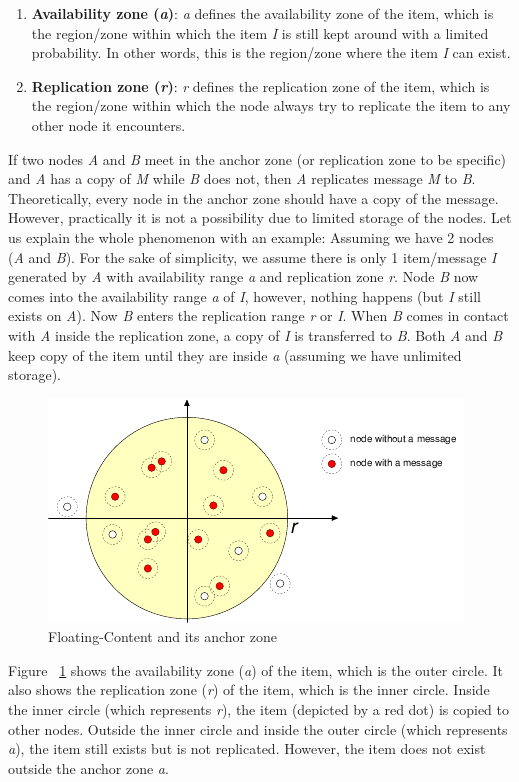 \begin{enumerate}
  \item \textbf{Availability zone (\textit{a})}: \textit{a} defines the availability zone of the item, which is the region/zone within which the item \textit{I} is still kept around with a limited probability. In other words, this is the region/zone where the item \textit{I} can exist.
  \item \textbf{Replication zone (\textit{r})}: \textit{r} defines the replication zone of the item, which is the region/zone within which the node always try to replicate the item to any other node it encounters.
\end{enumerate}
\vspace{3mm}
If two nodes \textit{A} and \textit{B} meet in the anchor zone (or replication zone to be specific) and \textit{A} has a copy of \textit{M} while \textit{B} does not, then \textit{A} replicates message \textit{M} to \textit{B}. Theoretically, every node in the anchor zone should have a copy of the message. However, practically it is not a possibility due to limited storage of the nodes.
\vspace{3mm}
Let us explain the whole phenomenon with an example:
Assuming we have 2 nodes (\textit{A} and \textit{B}). For the sake of simplicity, we assume there is only 1 item/message \textit{I} generated by \textit{A} with availability range \textit{a} and replication zone \textit{r}. Node \textit{B} now comes into the availability range \textit{a} of \textit{I}, however, nothing happens (but \textit{I} still exists on \textit{A}). Now \textit{B} enters the replication range \textit{r} or \textit{I}. When \textit{B} comes in contact with \textit{A} inside the replication zone, a copy of \textit{I} is transferred to \textit{B}. Both \textit{A} and \textit{B} keep copy of the item until they are inside \textit{a} (assuming we have unlimited storage).

\begin{figure}[h]
\centering
\includegraphics{./figures/anchor-zone}
\caption{Floating-Content and its anchor zone \cite{floating-content}}
\label{fig:floating-content}
\end{figure}
Figure ~\ref{fig:floating-content} shows the availability zone (\textit{a}) of the item, which is the outer circle. It also shows the replication zone (\textit{r}) of the item, which is the inner circle. Inside the inner circle (which represents \textit{r}), the item (depicted by a red dot) is copied to other nodes. Outside the inner circle and inside the outer circle (which represents \textit{a}), the item still exists but is not replicated. However, the item does not exist outside the anchor zone \textit{a}.

